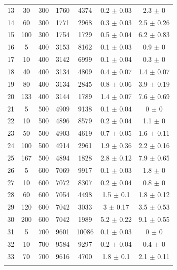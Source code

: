 \documentclass[11pt]{article}
\begin{document}
\begin{table}[]
{\begin{tabular}{ccccccc}
				\rowcolor[HTML]{EFEFEF} 
				13 & 30 & 300 & 1760 & 4374 & 0.2 $\pm$ 0.03 & 2.3 $\pm$ 0 \\
				\rowcolor[HTML]{EFEFEF} 
				14 & 60 & 300 & 1771 & 2968 & 0.3 $\pm$ 0.03 & 2.5 $\pm$ 0.26 \\
				\rowcolor[HTML]{EFEFEF} 
				15 & 100 & 300 & 1754 & 1729 & 0.5 $\pm$ 0.04 & 6.2 $\pm$ 0.83 \\
				16 & 5 & 400 & 3153 & 8162 & 0.1 $\pm$ 0.03 & 0.9 $\pm$ 0 \\
				17 & 10 & 400 & 3142 & 6999 & 0.1 $\pm$ 0.04 & 0.3 $\pm$ 0 \\
				18 & 40 & 400 & 3134 & 4809 & 0.4 $\pm$ 0.07 & 1.4 $\pm$ 0.07 \\
				19 & 80 & 400 & 3134 & 2845 & 0.8 $\pm$ 0.06 & 3.9 $\pm$ 0.19 \\
				20 & 133 & 400 & 3144 & 1789 & 1.4 $\pm$ 0.07 & 7.6 $\pm$ 0.69 \\
				\rowcolor[HTML]{EFEFEF} 
				21 & 5 & 500 & 4909 & 9138 & 0.1 $\pm$ 0.04 & 0 $\pm$ 0 \\
				\rowcolor[HTML]{EFEFEF} 
				22 & 10 & 500 & 4896 & 8579 & 0.2 $\pm$ 0.04 & 1.1 $\pm$ 0 \\
				\rowcolor[HTML]{EFEFEF} 
				23 & 50 & 500 & 4903 & 4619 & 0.7 $\pm$ 0.05 & 1.6 $\pm$ 0.11 \\
				\rowcolor[HTML]{EFEFEF} 
				24 & 100 & 500 & 4914 & 2961 & 1.9 $\pm$ 0.36 & 2.2 $\pm$ 0.16 \\
				\rowcolor[HTML]{EFEFEF} 
				25 & 167 & 500 & 4894 & 1828 & 2.8 $\pm$ 0.12 & 7.9 $\pm$ 0.65 \\
				26 & 5 & 600 & 7069 & 9917 & 0.1 $\pm$ 0.03 & 1.8 $\pm$ 0 \\
				27 & 10 & 600 & 7072 & 8307 & 0.2 $\pm$ 0.04 & 0.8 $\pm$ 0 \\
				28 & 60 & 600 & 7054 & 4498 & 1.5 $\pm$ 0.1 & 1.8 $\pm$ 0.12 \\
				29 & 120 & 600 & 7042 & 3033 & 3 $\pm$ 0.17 & 3.5 $\pm$ 0.53 \\
				30 & 200 & 600 & 7042 & 1989 & 5.2 $\pm$ 0.22 & 9.1 $\pm$ 0.55 \\
				\rowcolor[HTML]{EFEFEF} 
				31 & 5 & 700 & 9601 & 10086 & 0.1 $\pm$ 0.03 & 0 $\pm$ 0 \\
				\rowcolor[HTML]{EFEFEF} 
				32 & 10 & 700 & 9584 & 9297 & 0.2 $\pm$ 0.04 & 0.4 $\pm$ 0 \\
				\rowcolor[HTML]{EFEFEF} 
				33 & 70 & 700 & 9616 & 4700 & 1.8 $\pm$ 0.1 & 2.1 $\pm$ 0.11 \\
				\rowcolor[HTML]{EFEFEF} 

\end{tabular}}
\end{table}
\end{document}
